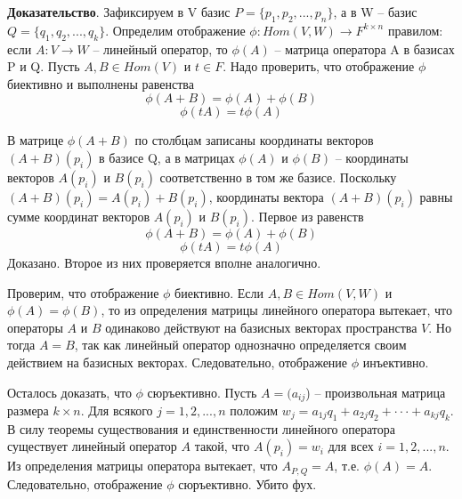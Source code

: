 \documentclass[a4paper]{article}
\begin{document}
    \begin{hproof}
        \textbf{Доказательство}. Зафиксируем в V базис $P = \{ p_1, p_2, . . . , p_n \}$, а в W –
        базис $Q = \{ q_1, q_2, . . . , q_k \}$. Определим отображение
        $\phi: Hom(V, W) \rightarrow F^{k \times n}$
        правилом: если $A: V \rightarrow W$ – линейный оператор,
        то $\phi(A)$ – матрица оператора A в базисах P и Q. Пусть $A, B \in Hom(V)$ и
        $t \in F$. Надо проверить, что отображение $\phi$ биективно и выполнены равенства \begin{equation}
                                                                                              \phi (A+B) = \phi(A) + \phi(B)
        \end{equation}
        \begin{equation}
            \phi(tA) = t \phi(A)
        \end{equation}

        В матрице $\phi(A+B)$ по столбцам записаны координаты векторов
        $(A + B)(p_i)$ в базисе Q, а в матрицах $\phi(A)$ и $\phi(B)$ – координаты векторов
        $A(p_i)$ и $B(p_i)$ соответственно в том же базисе. Поскольку
        $(A + B)(p_i) = A(p_i) + B(p_i)$, координаты вектора $(A + B)(p_i)$ равны
        сумме координат векторов $A(p_i)$ и $B(p_i)$. Первое из равенств \begin{equation}
                                                                             \phi (A+B) = \phi(A) + \phi(B)
        \end{equation}
        \begin{equation}
            \phi(tA) = t \phi(A)
        \end{equation}
        Доказано. Второе из них проверяется вполне аналогично.

        Проверим, что отображение $\phi$ биективно. Если $A, B \in Hom(V, W)$ и
        $\phi(A) = \phi(B)$, то из определения матрицы линейного оператора вытекает,
        что операторы $A$ и $B$ одинаково действуют на базисных векторах
        пространства $V$. Но тогда $A = B$, так как линейный оператор однозначно
        определяется своим действием на базисных векторах. Следовательно,
        отображение $\phi$ инъективно.

        Осталось доказать, что $\phi$ сюръективно. Пусть $A = (a_{ij}$) – произвольная
        матрица размера $k \times n$. Для всякого $j = 1, 2, . . . , n$ положим
        $w_j = a_{1j}q_1 + a_{2j}q_2 + · · · + a_{kj}q_k$. В силу теоремы существования и
        единственности линейного оператора существует линейный оператор $A$
        такой, что $A(p_i) = w_i$ для всех $i = 1, 2, . . . , n$. Из определения матрицы
        оператора вытекает, что $A_{P,Q} = A$, т.е. $\phi(A) = A$. Следовательно, отображение $\phi$ сюръективно. Убито фух.
    \end{hproof}
\end{document}
